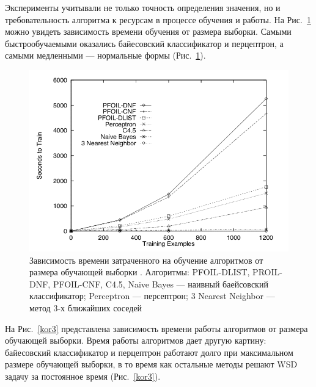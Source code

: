 \documentclass{article}
\begin{document}
\begin{articletext}
Эксперименты учитывали не только точность определения значения, но и требовательность алгоритма к ресурсам в процессе обучения и работы. На Рис.~\ref{kor2} можно увидеть зависимость времени обучения от размера выборки. Самыми быстрообучаемыми оказались байесовский классификатор и перцептрон, а самыми медленными --- нормальные формы (Рис.~\ref{kor2}).

\begin{figure}[H]
\includegraphics[keepaspectratio=true,
 width=0.9\columnwidth]{line_wsd_2_time.png}
\caption{Зависимость времени затраченного на обучение алгоритмов от размера обучающей выборки \cite{Mooney 1996}. Алгоритмы: PFOIL-DLIST, PROIL-DNF, PFOIL-CNF, C4.5, Naive Bayes --- наивный баейсовский классификатор; Perceptron --- персептрон; 3 Nearest Neighbor --- метод 3-х ближайших соседей}
\label{kor2}
\end{figure}

На Рис.~\ref{kor3} представлена зависимость времени работы алгоритмов от размера обучающей выборки. Время работы алгоритмов дает другую картину: байесовский классификатор и перцептрон работают долго при максимальном размере обучающей выборки, в то время как остальные методы решают WSD задачу за постоянное время (Рис.~\ref{kor3}). 


\end{articletext}
\end{document}
